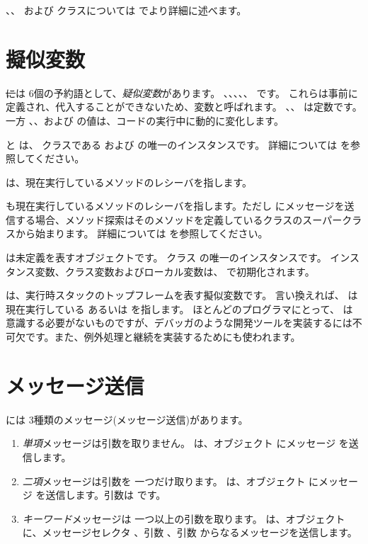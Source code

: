 \documentclass[a4paper,10pt,twoside]{book}
\begin{document}
、、 および  クラスについては  でより詳細に述べます。


\section{擬似変数}

\st には 6個の予約語として、\emph{疑似変数}があります。
、、、、、 です。
これらは事前に定義され、代入することができないため、変数と呼ばれます。
、、 は定数です。一方 、、および  の値は、コードの実行中に動的に変化します。

 と  は、 クラスである  および  の唯一のインスタンスです。
詳細については  を参照してください。

 は、現在実行しているメソッドのレシーバを指します。

 も現在実行しているメソッドのレシーバを指します。ただし \super にメッセージを送信する場合、メソッド探索はそのメソッドを定義しているクラスのスーパークラスから始まります。
詳細については  を参照してください。

 は未定義を表すオブジェクトです。
クラス  の唯一のインスタンスです。
インスタンス変数、クラス変数およびローカル変数は、 で初期化されます。

 は、実行時スタックのトップフレームを表す擬似変数です。
言い換えれば、  は現在実行している  あるいは  を指します。
ほとんどのプログラマにとって、 は意識する必要がないものですが、デバッガのような開発ツールを実装するには不可欠です。また、例外処理と継続を実装するためにも使われます。

\section{メッセージ送信}

\pharo には 3種類のメッセージ(メッセージ送信)があります。
\begin{enumerate}
  \item \emph{単項}メッセージは引数を取りません。
  は、オブジェクト  にメッセージ  を送信します。
  \item \emph{二項}メッセージは引数を 一つだけ取ります。
  	 は、オブジェクト  にメッセージ \ct{+} を送信します。引数は  です。
  \item \emph{キーワード}メッセージは 一つ以上の引数を取ります。
  	 は、オブジェクト  に、メッセージセレクタ
	、引数 、引数  からなるメッセージを送信します。
\end{enumerate}
\end{document}

